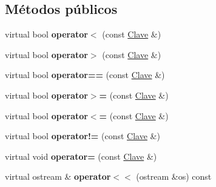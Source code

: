 \subsection*{\-Métodos públicos}
\begin{DoxyCompactItemize}
\item 
\hypertarget{class_clave_numerica_aa2ad3336d6fff8ac3aef05ce4b5d4c00}{virtual bool {\bfseries operator$<$} (const \hyperlink{class_clave}{\-Clave} \&)}\label{class_clave_numerica_aa2ad3336d6fff8ac3aef05ce4b5d4c00}

\item 
\hypertarget{class_clave_numerica_ab978dd4a19a30aa92df752400d401120}{virtual bool {\bfseries operator$>$} (const \hyperlink{class_clave}{\-Clave} \&)}\label{class_clave_numerica_ab978dd4a19a30aa92df752400d401120}

\item 
\hypertarget{class_clave_numerica_a28a657e11cf77e08edf3e33ce75d6f3e}{virtual bool {\bfseries operator==} (const \hyperlink{class_clave}{\-Clave} \&)}\label{class_clave_numerica_a28a657e11cf77e08edf3e33ce75d6f3e}

\item 
\hypertarget{class_clave_numerica_a94a76b5c38f570aec97bc8665ae0ecbf}{virtual bool {\bfseries operator$>$=} (const \hyperlink{class_clave}{\-Clave} \&)}\label{class_clave_numerica_a94a76b5c38f570aec97bc8665ae0ecbf}

\item 
\hypertarget{class_clave_numerica_afd48cf83d532a341d6f71ef444fb82b0}{virtual bool {\bfseries operator$<$=} (const \hyperlink{class_clave}{\-Clave} \&)}\label{class_clave_numerica_afd48cf83d532a341d6f71ef444fb82b0}

\item 
\hypertarget{class_clave_numerica_a023b2f3cd451a19d42aa6c94adb1f258}{virtual bool {\bfseries operator!=} (const \hyperlink{class_clave}{\-Clave} \&)}\label{class_clave_numerica_a023b2f3cd451a19d42aa6c94adb1f258}

\item 
\hypertarget{class_clave_numerica_a638e65204a597154f9fe1820de582cb9}{virtual void {\bfseries operator=} (const \hyperlink{class_clave}{\-Clave} \&)}\label{class_clave_numerica_a638e65204a597154f9fe1820de582cb9}

\item 
\hypertarget{class_clave_numerica_a4081f5d551a76bce78b280af65026869}{virtual ostream \& {\bfseries operator$<$$<$} (ostream \&os) const }\label{class_clave_numerica_a4081f5d551a76bce78b280af65026869}


\end{DoxyCompactItemize}
